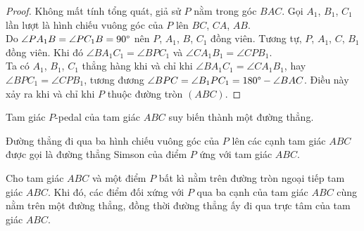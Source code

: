         \begin{proof}
            Không mất tính tổng quát, giả sử \(P\) nằm trong góc \(BAC\). Gọi \(A_1\), \(B_1\), \(C_1\) lần lượt là hình chiếu vuông góc của \(P\) lên \(BC\), \(CA\), \(AB\).\\
            Do \(\angle PA_1B = \angle PC_1B = 90 \degree\) nên \(P\), \(A_1\), \(B\), \(C_1\) đồng viên. Tương tự, \(P\), \(A_1\), \(C\), \(B_1\) đồng viên. Khi đó \(\angle BA_1C_1 = \angle BPC_1\) và \(\angle CA_1B_1 = \angle CPB_1\).\\
            Ta có \(A_1\), \(B_1\), \(C_1\) thẳng hàng khi và chỉ khi \(\angle BA_1C_1 = \angle CA_1B_1\), hay \(\angle BPC_1 = \angle CPB_1\), tương đương \(\angle BPC = \angle B_1PC_1 = 180 \degree - \angle BAC\). Điều này xảy ra khi và chỉ khi \(P\) thuộc đường tròn \((ABC)\).
        \end{proof}

        \begin{remark}
            Tam giác \(P\)-pedal của tam giác \(ABC\) suy biến thành một đường thẳng.
        \end{remark}

        \begin{definition}
            Đường thẳng đi qua ba hình chiếu vuông góc của \(P\) lên các cạnh tam giác \(ABC\) được gọi là đường thẳng Simson của điểm \(P\) ứng với tam giác \(ABC\).
        \end{definition}

        \begin{theorem}
            Cho tam giác \(ABC\) và một điểm \(P\) bất kì nằm trên đường tròn ngoại tiếp tam giác \(ABC\). Khi đó, các điểm đối xứng với \(P\) qua ba cạnh của tam giác \(ABC\) cùng nằm trên một đường thẳng, đồng thời đường thẳng ấy đi qua trực tâm của tam giác \(ABC\).
        \end{theorem}

